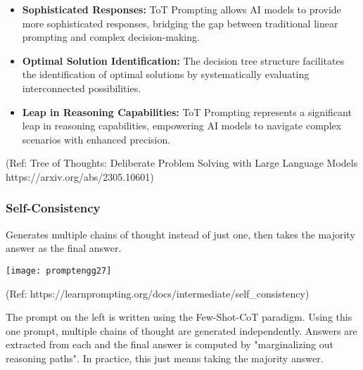 \begin{frame}[fragile]
\begin{itemize}
  \item \textbf{Sophisticated Responses:} ToT Prompting allows AI models to provide more sophisticated responses, bridging the gap between traditional linear prompting and complex decision-making.
  
  \item \textbf{Optimal Solution Identification:} The decision tree structure facilitates the identification of optimal solutions by systematically evaluating interconnected possibilities.
  
  \item \textbf{Leap in Reasoning Capabilities:} ToT Prompting represents a significant leap in reasoning capabilities, empowering AI models to navigate complex scenarios with enhanced precision.
  
\end{itemize}


{\tiny (Ref: Tree of Thoughts: Deliberate Problem Solving with Large Language Models https://arxiv.org/abs/2305.10601)}



\end{frame}



\begin{frame}[fragile]\frametitle{Self-Consistency}

Generates multiple chains of thought instead of just one, then takes the majority answer as the final answer.

\begin{center}
\texttt{[image: promptengg27]}

{\tiny (Ref: https://learnprompting.org/docs/intermediate/self\_consistency)}

\end{center}		

The prompt on the left is written using the Few-Shot-CoT paradigm. Using this one prompt, multiple chains of thought are generated independently. Answers are extracted from each and the final answer is computed by "marginalizing out reasoning paths". In practice, this just means taking the majority answer.

\end{frame}

